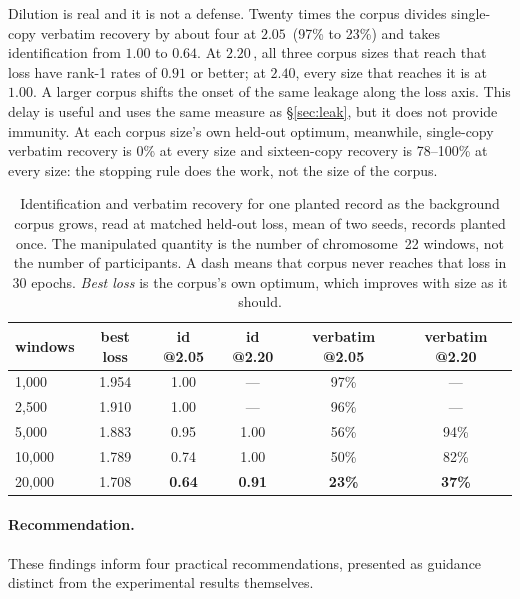 Dilution is real and it is not a defense. Twenty times the corpus divides single-copy verbatim
recovery by about four at $2.05$\,\bits{} (97\% to 23\%) and takes identification from $1.00$ to
$0.64$. At $2.20$\,\bits{}, all three corpus sizes that reach that loss have rank-1 rates
of $0.91$ or better; at $2.40$, every size that reaches it is at $1.00$. A larger corpus shifts the onset of the same leakage along the loss axis. This delay is useful and
uses the same measure as \S\ref{sec:leak}, but it does not provide immunity. At each corpus size's own held-out optimum, meanwhile,
single-copy verbatim recovery is 0\% at every size and sixteen-copy recovery is 78--100\% at every
size: the stopping rule does the work, not the size of the corpus.

\begin{table}[tbp]
\centering
\caption{Identification and verbatim recovery for one planted record as the background corpus grows,
read at matched held-out loss, mean of two seeds, records planted once. The manipulated quantity is the number of
chromosome~22 windows, not the number of participants. A dash means that corpus never reaches that
loss in 30 epochs. \emph{Best loss} is the corpus's own optimum, which improves with size as it
should.}
\label{tab:scale}
\begin{tabular}{lccccc}
\toprule
windows & best loss & id @2.05 & id @2.20 & verbatim @2.05 & verbatim @2.20 \\
\midrule
1{,}000  & 1.954 & 1.00          & ---           & 97\%          & --- \\
2{,}500  & 1.910 & 1.00          & ---           & 96\%          & --- \\
5{,}000  & 1.883 & 0.95          & 1.00          & 56\%          & 94\% \\
10{,}000 & 1.789 & 0.74          & 1.00          & 50\%          & 82\% \\
20{,}000 & 1.708 & \textbf{0.64} & \textbf{0.91} & \textbf{23\%} & \textbf{37\%} \\
\bottomrule
\end{tabular}
\end{table}

\paragraph{Recommendation.}
These findings inform four practical recommendations, presented as guidance distinct from the
experimental results themselves.

